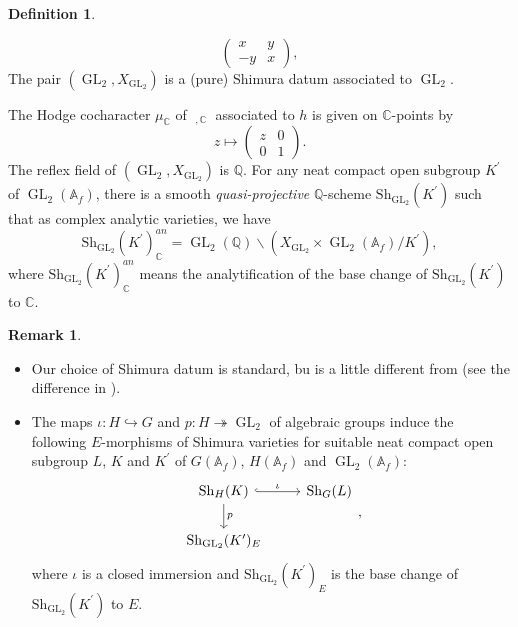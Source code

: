\documentclass[11pt, a4paper]{amsart}
\theoremstyle{plain}
\theoremstyle{definition}
\newtheorem{definition}[theorem]{Definition}
\newtheorem{remark}[theorem]{Remark}
\numberwithin{equation}{section}
\def\AAA{\mathbb{A}}
\def\CC{\mathbb{C}}
\def\QQ{\mathbb{Q}}
\DeclareMathOperator{\GL}{\mathrm{GL}}
\DeclareMathOperator{\Gm}{\mathrm{G_{m}}}
\newcommand{\Sh}{\mathrm{Sh}}
\begin{document}
\begin{definition}
\begin{enumerate}
\begin{equation*}
\begin{pmatrix}
                                x & y \\
                                -y & x
                              \end{pmatrix},
              \end{equation*}
              The pair $(\GL_2, X_{\GL_2})$ is a (pure) Shimura datum associated to $\GL_2$. 
              \par The Hodge cocharacter $\mu_{\CC}$ of $\Gm_{, \CC}$ associated to $h$ is given on $\CC$-points by 
              \begin{equation*}
                  z \mapsto \begin{pmatrix}
                                z & 0 \\
                                0 & 1 
                            \end{pmatrix}.
              \end{equation*}
              The reflex field of $(\GL_2, X_{\GL_{2}})$ is $\QQ$. 
              For any neat compact open subgroup $K^{\prime}$ of $\GL_{2}(\AAA_f)$, there is a smooth \textit{quasi-projective} $\QQ$-scheme $\Sh_{\GL_{2}}(K^{\prime})$ such that as complex analytic varieties, we have 
              \begin{equation*}
                    \Sh_{\GL_2}(K^{\prime})_{\CC}^{an} = \GL_{2}(\QQ) \backslash (X_{\GL_2} \times \GL_2(\AAA_f) / K^{\prime}), 
              \end{equation*}
              where $\Sh_{\GL_2}(K^{\prime})_{\CC}^{an}$ means the analytification of the base change of $\Sh_{\GL_2}(K^{\prime})$ to $\CC$.
    \end{enumerate}
\end{definition}
\begin{remark}
    \begin{itemize}
        \item Our choice of Shimura datum is standard, bu is a little different from \cite[8.1.1]{LSZ22} (see the difference in \cite[Remark 8.1.1]{LSZ22}). 
        \item The maps $\iota \colon H \hookrightarrow G$ and $p \colon H \twoheadrightarrow \GL_2$ of algebraic groups induce the following $E$-morphisms of Shimura varieties for suitable neat compact open subgroup $L$, $K$ and $K^{\prime}$ of $G(\AAA_f)$, $H(\AAA_f)$ and $\GL_2(\AAA_f)$: 
        \begin{equation}
        \label{eq: morphism of Shimura varieties over E}
            \begin{tikzcd}
                \Sh_{H}(K) \ar[r, hook, "\iota"] \ar[d, rightarrow, "p"] & \Sh_{G}(L) \\
                \Sh_{\GL_2}(K^{\prime})_{E}  &  
            \end{tikzcd},
        \end{equation}
        where $\iota$ is a closed immersion and $\Sh_{\GL_2}(K^{\prime})_{E}$ is the base change of $\Sh_{\GL_2}(K^{\prime})$ to $E$. 
    \end{itemize}
\end{remark}
\end{document}
